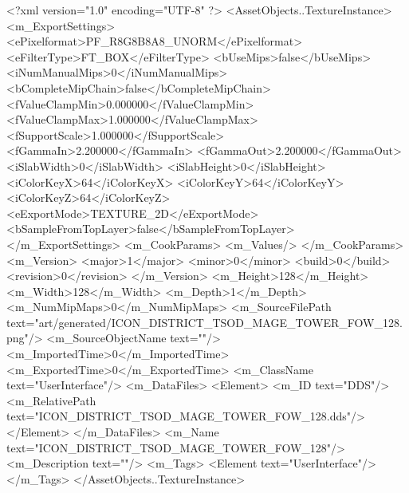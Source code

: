 <?xml version="1.0" encoding="UTF-8" ?>
<AssetObjects..TextureInstance>
	<m_ExportSettings>
		<ePixelformat>PF_R8G8B8A8_UNORM</ePixelformat>
		<eFilterType>FT_BOX</eFilterType>
		<bUseMips>false</bUseMips>
		<iNumManualMips>0</iNumManualMips>
		<bCompleteMipChain>false</bCompleteMipChain>
		<fValueClampMin>0.000000</fValueClampMin>
		<fValueClampMax>1.000000</fValueClampMax>
		<fSupportScale>1.000000</fSupportScale>
		<fGammaIn>2.200000</fGammaIn>
		<fGammaOut>2.200000</fGammaOut>
		<iSlabWidth>0</iSlabWidth>
		<iSlabHeight>0</iSlabHeight>
		<iColorKeyX>64</iColorKeyX>
		<iColorKeyY>64</iColorKeyY>
		<iColorKeyZ>64</iColorKeyZ>
		<eExportMode>TEXTURE_2D</eExportMode>
		<bSampleFromTopLayer>false</bSampleFromTopLayer>
	</m_ExportSettings>
	<m_CookParams>
		<m_Values/>
	</m_CookParams>
	<m_Version>
		<major>1</major>
		<minor>0</minor>
		<build>0</build>
		<revision>0</revision>
	</m_Version>
	<m_Height>128</m_Height>
	<m_Width>128</m_Width>
	<m_Depth>1</m_Depth>
	<m_NumMipMaps>0</m_NumMipMaps>
	<m_SourceFilePath text="art/generated/ICON_DISTRICT_TSOD_MAGE_TOWER_FOW_128.png"/>
	<m_SourceObjectName text=""/>
	<m_ImportedTime>0</m_ImportedTime>
	<m_ExportedTime>0</m_ExportedTime>
	<m_ClassName text="UserInterface"/>
	<m_DataFiles>
		<Element>
			<m_ID text="DDS"/>
			<m_RelativePath text="ICON_DISTRICT_TSOD_MAGE_TOWER_FOW_128.dds"/>
		</Element>
	</m_DataFiles>
	<m_Name text="ICON_DISTRICT_TSOD_MAGE_TOWER_FOW_128"/>
	<m_Description text=""/>
	<m_Tags>
		<Element text="UserInterface"/>
	</m_Tags>
</AssetObjects..TextureInstance>
